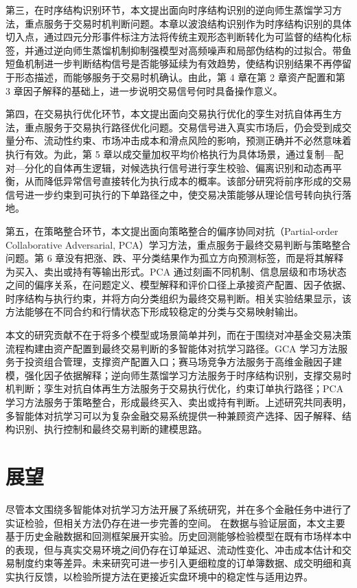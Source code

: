 第三，在时序结构识别环节，本文提出面向时序结构识别的逆向师生蒸馏学习方法，重点服务于交易时机判断问题。本章以波浪结构识别作为时序结构识别的具体切入点，通过四元分形事件标注方法将传统主观形态判断转化为可监督的结构化标签，并通过逆向师生蒸馏机制抑制强模型对高频噪声和局部伪结构的过拟合。带鱼短鱼机制进一步判断结构信号是否能够延续为有效趋势，使结构识别结果不再停留于形态描述，而能够服务于交易时机确认。由此，第 4 章在第 2 章资产配置和第 3 章因子解释的基础上，进一步说明交易信号何时具备操作意义。

第四，在交易执行优化环节，本文提出面向交易执行优化的孪生对抗自体再生方法，重点服务于交易执行路径优化问题。交易信号进入真实市场后，仍会受到成交量分布、流动性约束、市场冲击成本和滑点风险的影响，预测正确并不必然意味着执行有效。为此，第 5 章以成交量加权平均价格执行为具体场景，通过复制—配对—分化的自体再生逻辑，对候选执行信号进行孪生校验、偏离识别和动态再平衡，从而降低异常信号直接转化为执行成本的概率。该部分研究将前序形成的交易信号进一步约束到可执行的下单路径之中，使交易决策能够从理论信号转向执行落地。

第五，在策略整合环节，本文提出面向策略整合的偏序协同对抗（Partial-order Collaborative Adversarial, PCA）学习方法，重点服务于最终交易判断与策略整合问题。第 6 章没有把涨、跌、平分类结果作为孤立方向预测标签，而是将其解释为买入、卖出或持有等输出形式。PCA 通过刻画不同机制、信息层级和市场状态之间的偏序关系，在问题定义、模型解释和评价口径上承接资产配置、因子依据、时序结构与执行约束，并将方向分类组织为最终交易判断。相关实验结果显示，该方法能够在不同合约和行情状态下形成较稳定的分类与交易映射输出。

本文的研究贡献不在于将多个模型或场景简单并列，而在于围绕对冲基金交易决策流程构建由资产配置到最终交易判断的多智能体对抗学习路径。GCA 学习方法服务于投资组合管理，支撑资产配置入口；赛马场竞争方法服务于高维金融因子建模，强化因子依据解释；逆向师生蒸馏学习方法服务于时序结构识别，支撑交易时机判断；孪生对抗自体再生方法服务于交易执行优化，约束订单执行路径；PCA 学习方法服务于策略整合，形成最终买入、卖出或持有判断。上述研究共同表明，多智能体对抗学习可以为复杂金融交易系统提供一种兼顾资产选择、因子解释、结构识别、执行控制和最终交易判断的建模思路。

\section{展望}

尽管本文围绕多智能体对抗学习方法开展了系统研究，并在多个金融任务中进行了实证检验，但相关方法仍存在进一步完善的空间。
在数据与验证层面，本文主要基于历史金融数据和回测框架展开实验。历史回测能够检验模型在既有市场样本中的表现，但与真实交易环境之间仍存在订单延迟、流动性变化、冲击成本估计和交易制度约束等差异。未来研究可进一步引入更细粒度的订单簿数据、成交明细和真实执行反馈，以检验所提方法在更接近实盘环境中的稳定性与适用边界。

